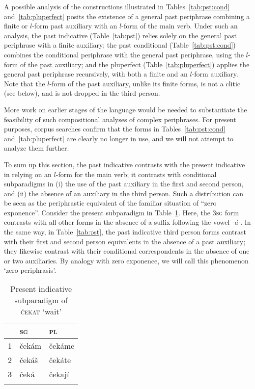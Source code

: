 \documentclass[output=paper]{langsci/langscibook}
\begin{document}
A possible analysis of the constructions illustrated in Tables~\ref{tab:pst:cond} and~\ref{tab:pluperfect} posits the existence of a general past periphrase combining a finite or $l$-form past auxiliary with an $l$-form of the main verb. Under such an analysis, the past indicative (Table~\ref{tab:pst}) relies solely on the general past periphrase with a finite auxiliary; the past conditional (Table~\ref{tab:pst:cond}) combines the conditional periphrase with the general past periphrase, using the $l$-form of the past auxiliary; and the pluperfect (Table~\ref{tab:pluperfect}) applies the general past periphrase recursively, with both a finite and an $l$-form auxiliary. Note that the $l$-form of the past auxiliary, unlike its finite  forms, is not a clitic (see below), and  is not dropped in the third person. 

More work on earlier stages of the language would be needed to substantiate the feasibility of such compositional analyses of complex periphrases. For present purposes, corpus searches confirm that the forms in Tables~\ref{tab:pst:cond} and~\ref{tab:pluperfect} are clearly no longer in use, and we will not attempt to analyze them further.

To sum up this section, the past indicative contrasts with the present indicative in relying on an $l$-form for the main verb; it contrasts with conditional subparadigms in (i) the use of the past auxiliary in the first and second person, and (ii) the absence of an auxiliary in the third person. Such a distribution can be seen as the periphrastic equivalent of the familiar situation of ``zero exponence''. Consider the present subparadigm in Table~\ref{tab:prs}. Here, the \textsc{3sg} form contrasts with all other forms in the absence of a suffix following the vowel \emph{-á-}. In the same way, in Table~\ref{tab:pst}, the past indicative third person forms contrast with their first and second person equivalents in the absence of a past auxiliary; they likewise contrast with their conditional correspondents in the absence of one or two auxiliaries. By analogy with zero exponence, we will call this phenomenon ‘zero periphrasis’.  

\begin{table}
\begin{tabular}{lll}
\lsptoprule
& \scshape sg & \scshape pl\\
\midrule
\scshape 1 & čekám & čekáme\\ 
\scshape 2 & čekáš & čekáte\\
\scshape 3 &  čeká & čekají\\ 
\lspbottomrule
\end{tabular}
\caption{Present indicative subparadigm of \textsc{\v{c}ekat} ‘wait’\label{tab:prs}}
\end{table}
\end{document}
